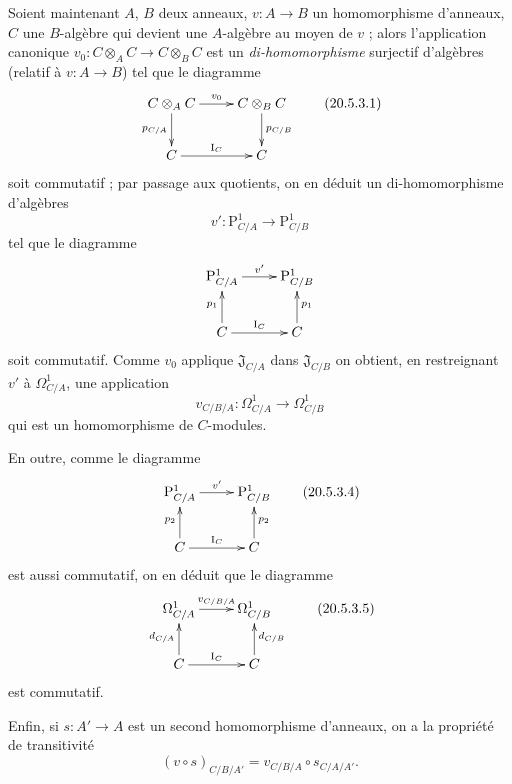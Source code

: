 \begin{env}[20.5.3]
\label{0.20.5.3-fr}
Soient maintenant $A$, $B$ deux anneaux, $v:A\to B$ un homomorphisme
d'anneaux, $C$ une $B$-algèbre qui devient une $A$-algèbre au moyen de $v$ ;
alors l'application canonique $v_0:C\otimes_A C\to C\otimes_B C$ est un
\emph{di-homomorphisme} surjectif d'algèbres (relatif à $v:A\to B$) tel que
le diagramme
\[
\xymatrix{
  C\otimes_A C \ar[r]^{v_0} \ar[d]_{p_{C/A}} &
  C\otimes_B C \ar[d]^{p_{C/B}} \\
  C \ar[r]^{\mathrm{I}_C} & C
}
\tag{20.5.3.1}
\label{0.20.5.3.1-fr}
\]
soit commutatif ; par passage aux quotients, on en déduit un
di-homomorphisme d'algèbres
\begin{equation}
\tag{20.5.3.2}
\label{0.20.5.3.2-fr}
  v':\mathrm{P}^1_{C/A}\to\mathrm{P}^1_{C/B}
\end{equation}
tel que le diagramme
\[
\xymatrix{
  \mathrm{P}^1_{C/A} \ar[r]^{v'} & \mathrm{P}^1_{C/B} \\
  C \ar[u]^{p_1} \ar[r]^{\mathrm{I}_C} & C \ar[u]_{p_1}
}
\]
soit commutatif. Comme $v_0$ applique $\mathfrak{J}_{C/A}$ dans
$\mathfrak{J}_{C/B}$ on obtient, en restreignant $v'$ à
$\Omega^1_{C/A}$, une application
\begin{equation}
\tag{20.5.3.3}
\label{0.20.5.3.3-fr}
  v_{C/B/A}:\Omega^1_{C/A}\to\Omega^1_{C/B}
\end{equation}
qui est un homomorphisme de $C$-modules.

En outre, comme le diagramme
\[
\xymatrix{
  \mathrm{P}^1_{C/A} \ar[r]^{v'} & \mathrm{P}^1_{C/B} \\
  C \ar[u]^{p_2} \ar[r]^{\mathrm{I}_C} & C \ar[u]_{p_2}
}
\tag{20.5.3.4}
\label{0.20.5.3.4-fr}
\]
est aussi commutatif, on en déduit que le diagramme
\[
\xymatrix{
  \Omega^1_{C/A} \ar[r]^{v_{C/B/A}} & \Omega^1_{C/B} \\
  C \ar[u]^{d_{C/A}} \ar[r]^{\mathrm{I}_C} & C \ar[u]_{d_{C/B}}
}
\tag{20.5.3.5}
\label{0.20.5.3.5-fr}
\]
est commutatif.

Enfin, si $s:A'\to A$ est un second homomorphisme d'anneaux, on a la
propriété de transitivité
\begin{equation}
\tag{20.5.3.6}
\label{0.20.5.3.6-fr}
  (v\circ s)_{C/B/A'}=v_{C/B/A}\circ s_{C/A/A'}.
\end{equation}
\end{env}

